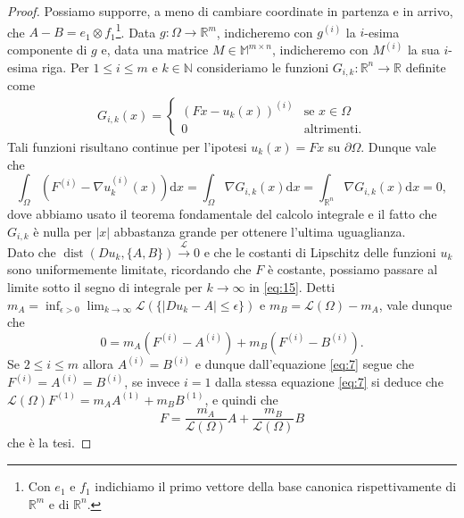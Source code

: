\documentclass[a4paper,11pt]{book}
\theoremstyle{plain}
\theoremstyle{definition}
\theoremstyle{remark}
\newcommand{\R}{\mathbb{R}}
\newcommand{\N}{\mathbb{N}}
\newcommand{\M}{\mathbb{M}}
\newcommand{\LL}{\mathscr{L}}
\newcommand{\dx}{\text{d}x}
\DeclareMathOperator{\dist}{dist}
\begin{document}
\begin{proof}
	Possiamo supporre, a meno di cambiare coordinate in partenza e in arrivo, che $A-B=e_1\otimes f_1$\footnote{Con $e_1$ e $f_1$ indichiamo il primo vettore della base canonica rispettivamente di $\R^m$ e di $\R^n$.}. Data $g:\Omega\to\R^m$, indicheremo con $g^{(i)}$ la $i$-esima componente di $g$ e, data una matrice $M\in\M^{m\times n}$, indicheremo con $M^{(i)}$ la sua $i$-esima riga. Per $1\leq i\leq m$ e $k\in\N$ consideriamo le funzioni $G_{i,k}:\R^n\to\R$ definite come
	\begin{align*}
        G_{i,k}(x) = \begin{cases}
                    (Fx-u_k(x))^{(i)} & \text{se }x\in \Omega\\
                    0 & \text{altrimenti.}
                \end{cases}
	\end{align*}
    Tali funzioni risultano continue per l'ipotesi $u_k(x) = Fx$ su $\partial \Omega$. Dunque vale che
    \begin{equation}\label{eq:15}
    	\int_{\Omega}\left(F^{(i)}-\nabla u_k^{(i)}(x)\right)\dx = \int_{\Omega}\nabla G_{i,k}(x)\dx = \int_{\R^n}\nabla G_{i,k}(x)\dx = 0,
    \end{equation}
    dove abbiamo usato il teorema fondamentale del calcolo integrale e il fatto che $G_{i,k}$ è nulla per $|x|$ abbastanza grande per ottenere l'ultima uguaglianza.\\
	Dato che $\dist(Du_k,\{A,B\})\xrightarrow{\LL} 0$ e che le costanti di Lipschitz delle funzioni  $u_k$ sono uniformemente limitate, ricordando che $F$ è costante, possiamo passare al limite sotto il segno di integrale per $k\to\infty$ in \eqref{eq:15}. Detti $m_A=\inf_{\epsilon>0}\lim_{k\to\infty} \LL(\{|Du_k-A|\leq\epsilon\})$ e $m_B=\LL(\Omega)-m_A$, vale dunque che
	\begin{equation}\label{eq:7}
		0 = m_A\left(F^{(i)}-A^{(i)}\right) + m_B\left(F^{(i)}-B^{(i)}\right).
	\end{equation}
	Se $2\leq i\leq m$ allora $A^{(i)} = B^{(i)}$ e dunque dall'equazione \eqref{eq:7} segue che $F^{(i)} = A^{(i)} = B^{(i)}$, se invece $i=1$ dalla stessa equazione \eqref{eq:7} si deduce che $\LL(\Omega)F^{(1)} = m_AA^{(1)}+m_BB^{(1)}$, e quindi che
	\[
        F = \frac{m_A}{\LL(\Omega)}A+\frac{m_B}{\LL(\Omega)}B
	\]
	che è la tesi.
\end{proof}
\end{document}
